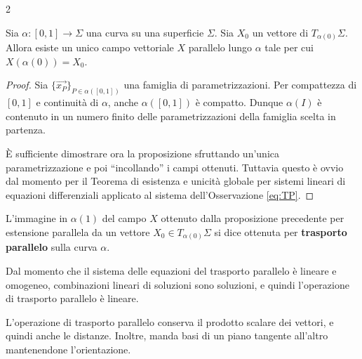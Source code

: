 \begin{multicols*}{2}
    \begin{proposition}
        Sia $\alpha : [0, 1] \to \Sigma$ una curva su una superficie $\Sigma$.
        Sia $X_0$ un vettore di $T_{\alpha(0)} \Sigma$. Allora esiste un
        unico campo vettoriale $X$ parallelo lungo $\alpha$ tale per cui
        $X(\alpha(0)) = X_0$.
    \end{proposition}

    \begin{proof}
        Sia $\{\vec{x_P}\}_{P \in \alpha([0, 1])}$ una famiglia di
        parametrizzazioni. Per compattezza di $[0, 1]$ e continuità di $\alpha$, anche $\alpha([0, 1])$
        è compatto. Dunque $\alpha(I)$ è contenuto in un numero finito delle parametrizzazioni della
        famiglia scelta in partenza. \smallskip

        È sufficiente dimostrare ora la proposizione sfruttando un'unica parametrizzazione e poi ``incollando''
        i campi ottenuti. Tuttavia questo è ovvio dal momento per il Teorema di esistenza e unicità globale
        per sistemi lineari di equazioni differenziali applicato al sistema dell'Osservazione \ref{eq:TP}.
    \end{proof}

    \begin{definition}
        L'immagine in $\alpha(1)$ del campo $X$ ottenuto dalla proposizione precedente per estensione parallela
        da un vettore $X_0 \in T_{\alpha(0)} \Sigma$ si dice ottenuta per \textbf{trasporto parallelo} sulla
        curva $\alpha$.
    \end{definition}

    \begin{remark}
        Dal momento che il sistema delle equazioni del trasporto parallelo è lineare e omogeneo,
        combinazioni lineari di soluzioni sono soluzioni, e quindi l'operazione di trasporto parallelo
        è lineare.
    \end{remark}

    \begin{proposition}
        L'operazione di trasporto parallelo conserva il prodotto scalare dei vettori,
        e quindi anche le distanze. Inoltre, manda basi di un piano tangente all'altro
        mantenendone l'orientazione.
    \end{proposition}


\end{multicols*}

